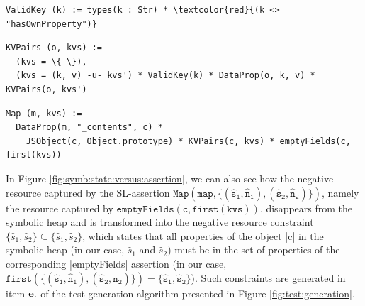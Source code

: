 %
%

\begin{Verbatim}[fontsize=\footnotesize,commandchars=\\\{\}]
ValidKey (k) := types(k : Str) * \textcolor{red}{(k <> "hasOwnProperty")}
\end{Verbatim}
 \begin{Verbatim}[fontsize=\footnotesize,commandchars=\\\{\}]
KVPairs (o, kvs) := 
  (kvs = \{ \}),
  (kvs = (k, v) -u- kvs') * ValidKey(k) * DataProp(o, k, v) * KVPairs(o, kvs')
\end{Verbatim}
\begin{Verbatim}[fontsize=\footnotesize,commandchars=\\\{\}]
Map (m, kvs) := 
  DataProp(m, "_contents", c) * 
    JSObject(c, Object.prototype) * KVPairs(c, kvs) * emptyFields(c, first(kvs))
\end{Verbatim}
%

In Figure \ref{fig:symb:state:versus:assertion}, we can also see how the negative resource captured by the SL-assertion {\small$\mathtt{Map(map, \{ (\hat{s}_1, \hat{n}_1), (\hat{s}_2, \hat{n}_2) \} )}$}, namely the resource captured by {\small$\mathtt{emptyFields(c, first(kvs))}$}, disappears from the symbolic heap and is transformed into the negative resource constraint $\{ \hat{s}_1, \hat{s}_2 \} \subseteq \{ \hat{s}_1, \hat{s}_2 \}$, which states that all properties of the object \jsinline|c| in the symbolic heap (in our case, $\hat{s}_1$ and $\hat{s}_2$) must be in the set of properties of the corresponding \jsinline|emptyFields| assertion (in our case, {\small$\mathtt{first(\{ (\hat{s}_1, \hat{n}_1), (\hat{s}_2, \hat{n}_2) \}) = \{ \hat{s}_1, \hat{s}_2 \}}$}).
Such constraints are generated in item ${\bf e.}$ of the test generation algorithm presented in Figure \ref{fig:test:generation}. 


